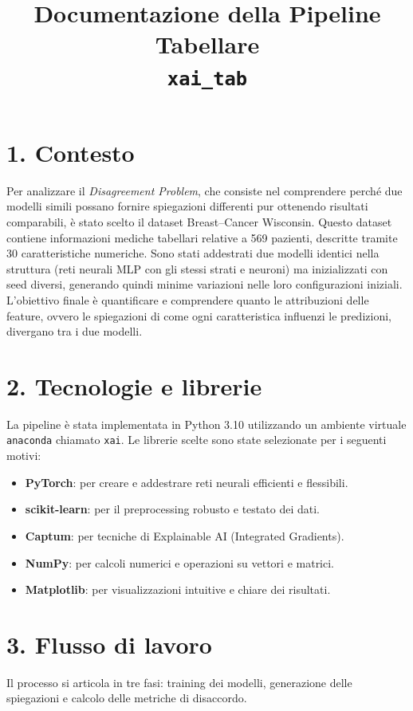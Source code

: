 \documentclass[a4paper,11pt]{article}
\title{Documentazione della Pipeline Tabellare \\ \texttt{xai\_tab}}
\begin{document}
\maketitle

\section*{1. Contesto}
Per analizzare il \emph{Disagreement Problem}, che consiste nel comprendere perché due modelli simili possano fornire spiegazioni differenti pur ottenendo risultati comparabili, è stato scelto il dataset Breast–Cancer Wisconsin. Questo dataset contiene informazioni mediche tabellari relative a 569 pazienti, descritte tramite 30 caratteristiche numeriche. Sono stati addestrati due modelli identici nella struttura (reti neurali MLP con gli stessi strati e neuroni) ma inizializzati con seed diversi, generando quindi minime variazioni nelle loro configurazioni iniziali. L'obiettivo finale è quantificare e comprendere quanto le attribuzioni delle feature, ovvero le spiegazioni di come ogni caratteristica influenzi le predizioni, divergano tra i due modelli.

\section*{2. Tecnologie e librerie}
La pipeline è stata implementata in Python 3.10 utilizzando un ambiente virtuale \texttt{anaconda} chiamato \texttt{xai}. Le librerie scelte sono state selezionate per i seguenti motivi:
\begin{itemize}
\item \textbf{PyTorch}: per creare e addestrare reti neurali efficienti e flessibili.
\item \textbf{scikit-learn}: per il preprocessing robusto e testato dei dati.
\item \textbf{Captum}: per tecniche di Explainable AI (Integrated Gradients).
\item \textbf{NumPy}: per calcoli numerici e operazioni su vettori e matrici.
\item \textbf{Matplotlib}: per visualizzazioni intuitive e chiare dei risultati.
\end{itemize}

\section*{3. Flusso di lavoro}
Il processo si articola in tre fasi: training dei modelli, generazione delle spiegazioni e calcolo delle metriche di disaccordo.
\end{document}
